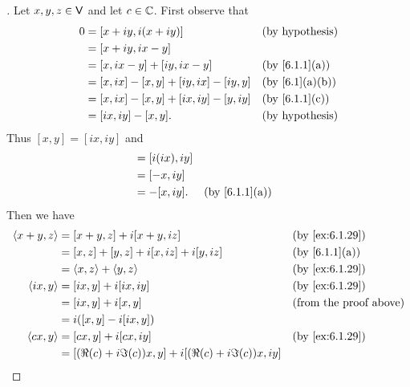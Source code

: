\begin{proof}[]
  Let \(x, y, z \in \mathsf{V}\) and let \(c \in \mathbb{C}\).
  First observe that
  \begin{align*}
    0 & = [x + iy, i(x + iy)]                   &  & \text{(by hypothesis)}       \\
      & = [x + iy, ix - y]                                                        \\
      & = [x, ix - y] + [iy, ix - y]            &  & \text{(by \cref{6.1.1}(a))}  \\
      & = [x, ix] - [x, y] + [iy, ix] - [iy, y] &  & \text{(by \cref{6.1}(a)(b))} \\
      & = [x, ix] - [x, y] + [ix, iy] - [y, iy] &  & \text{(by \cref{6.1.1}(c))}  \\
      & = [ix, iy] - [x, y].                    &  & \text{(by hypothesis)}
  \end{align*}
  Thus \([x, y] = [ix, iy]\) and
  \begin{align*}
    [ix, y] & = [i(ix), iy]                                  \\
            & = [-x, iy]                                     \\
            & = -[x, iy].   &  & \text{(by \cref{6.1.1}(a))}
  \end{align*}
  Then we have
  \begin{align*}
    \inn{x + y, z}    & = [x + y, z] + i[x + y, iz]                                 &  & \text{(by \cref{ex:6.1.29})}   \\
                      & = [x, z] + [y, z] + i[x, iz] + i[y, iz]                     &  & \text{(by \cref{6.1.1}(a))}    \\
                      & = \inn{x, z} + \inn{y, z}                                   &  & \text{(by \cref{ex:6.1.29})}   \\
    \inn{ix, y}       & = [ix, y] + i[ix, iy]                                       &  & \text{(by \cref{ex:6.1.29})}   \\
                      & = [ix, y] + i[x, y]                                         &  & \text{(from the proof above)}  \\
                      & = i([x, y] - i[ix, y])                                                                          \\
    \inn{cx, y}       & = [cx, y] + i[cx, iy]                                       &  & \text{(by \cref{ex:6.1.29})}   \\
                      & = [(\Re(c) + i \Im(c)) x, y] + i[(\Re(c) + i \Im(c)) x, iy]                                     \\

\end{align*}
\end{proof}
